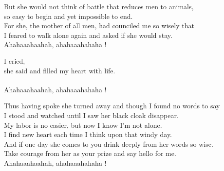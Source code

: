 {{But she would not think of battle that reduces men to animals,\\
so easy to begin and yet impossible to end.\\
For she, the mother of all men, had counciled me so wisely that\\
I feared to walk alone again and asked if she would stay.\\
Ahahaaahaahah, ahahaaahahaha !

 I cried, \\
 she said and filled my heart with life.\\
\\
Ahahaaahaahah, ahahaaahahaha !

Thus having spoke she turned away and though I found no words to say\\
I stood and watched until I saw her black cloak disappear.\\
My labor is no easier, but now I know I'm not alone.\\
I find new heart each time I think upon that windy day.\\
And if one day she comes to you drink deeply from her words so wise.\\
Take courage from her as your prize and say hello for me.\\
Ahahaaahaahah, ahahaaahahaha !\\
}
}


